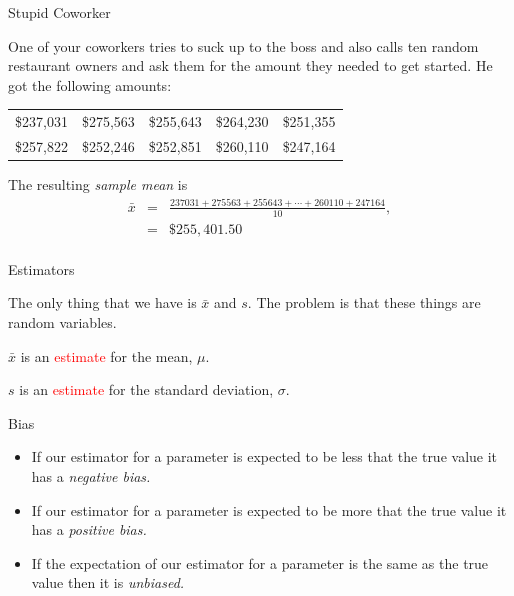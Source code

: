 \begin{frame}{Stupid Coworker}
  
  One of your coworkers tries to suck up to the boss and also calls
  ten random restaurant owners and ask them for the amount they needed
  to get started. He got the following amounts:
  \begin{tabular}{lllll}
    \$237,031 & \$275,563 & \$255,643 & \$264,230 & \$251,355 \\
    \$257,822 & \$252,246 & \$252,851 & \$260,110 & \$247,164
  \end{tabular}

  The resulting \textit{sample mean} is
  \begin{eqnarray*}
    \bar{x} & = &
    \frac{237031+275563+255643+\cdots+260110+247164}{10}, \\
    & = & \$255,401.50\\
  \end{eqnarray*}

  
\end{frame}


\begin{frame}{Estimators}

  The only thing that we have is $\bar{x}$ and $s$. The problem is
  that these things are random variables.

  $\bar{x}$ is an \textcolor{red}{estimate} for the mean, $\mu$.

  $s$ is an \textcolor{red}{estimate} for the standard deviation, $\sigma$.

  \begin{definition}{Bias}
    \begin{itemize}
    \item If our estimator for a parameter is {\color{red}expected} to be less that
      the true value it has a \textit{\color{blue}negative bias.}
    \item If our estimator for a parameter is {\color{red}expected} to be more that
      the true value it has a \textit{\color{blue} positive bias.}
    \item If the {\color{red}expectation} of our estimator for a parameter is the
      same as the true value then it is \textit{\color{blue} unbiased.}
    \end{itemize}
  \end{definition}
  
  \vfill

\end{frame}

